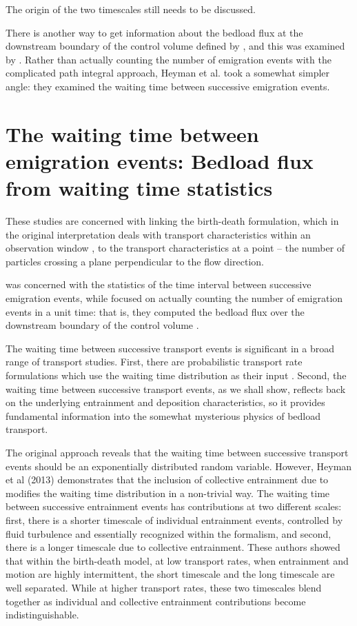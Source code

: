 The origin of the two timescales still needs to be discussed. 

There is another way to get information about the bedload flux at the downstream boundary of the control volume defined by \citet{Ancey2008}, and this was examined by \citet{Heyman2013, Heyman2016}. 
Rather than actually counting the number of emigration events with the complicated path integral approach, Heyman et al. took a somewhat simpler angle: they examined the waiting time between successive emigration events. 

\section{The waiting time between emigration events: Bedload flux from waiting time statistics} 

These studies are concerned with linking the birth-death formulation, which in the original interpretation deals with transport characteristics within an observation window \citep{Ancey2008}, to the transport characteristics at a point -- the number of particles crossing a plane perpendicular to the flow direction. 

\citet{Heyman2013} was concerned with the statistics of the time interval between successive emigration events, while \citet{Ma2014b} focused on actually counting the number of emigration events in a unit time: that is, they computed the bedload flux over the downstream boundary of the control volume \citet{Ancey2008}. 

The waiting time between successive transport events is significant in a broad range of transport studies. 
First, there are probabilistic transport rate formulations which use the waiting time distribution as their input \citep{Turowski2010}. 
Second, the waiting time between successive transport events, as we shall show, reflects back on the underlying entrainment and deposition characteristics, so it provides fundamental information into the somewhat mysterious physics of bedload transport.

The original \citet{Einstein1937,Einstein1950} approach reveals that the waiting time between successive transport events should be an exponentially distributed random variable. 
However, Heyman et al (2013) demonstrates that the inclusion of collective entrainment due to \citet{Ancey2008} modifies the waiting time distribution in a non-trivial way. 
The waiting time between successive entrainment events has contributions at two different scales: first, there is a shorter timescale of individual entrainment events, controlled by fluid turbulence and essentially recognized within the \citet{Einstein1937} formalism, and second, there is a longer timescale due to collective entrainment.
These authors showed that within the \citet{Ancey2008} birth-death model, at low transport rates, when entrainment and motion are highly intermittent, the short timescale and the long timescale are well separated. 
While at higher transport rates, these two timescales blend together as individual and collective entrainment contributions become indistinguishable. 

